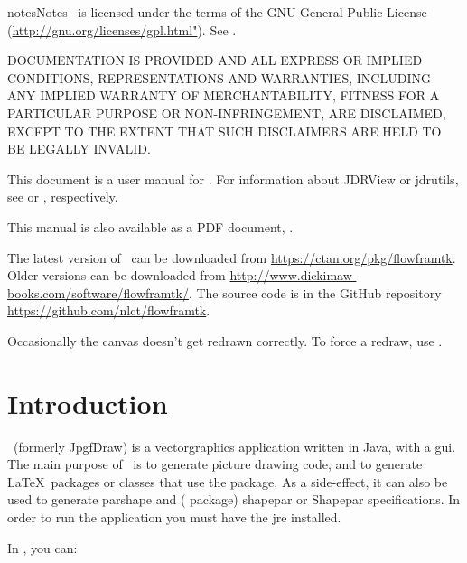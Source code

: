 \begin{prefrontmatterblock}{notes}{Notes}
\FlowframTk\ is licensed under the terms of the GNU General Public License
(\url{http://gnu.org/licenses/gpl.html"}).
See .

DOCUMENTATION IS PROVIDED  AND ALL EXPRESS OR IMPLIED
CONDITIONS, REPRESENTATIONS AND WARRANTIES, INCLUDING ANY
IMPLIED WARRANTY OF MERCHANTABILITY, FITNESS FOR A PARTICULAR
PURPOSE OR NON-INFRINGEMENT, ARE DISCLAIMED, EXCEPT TO THE EXTENT THAT
SUCH DISCLAIMERS ARE HELD TO BE LEGALLY INVALID.

This document is a user manual for \FlowframTk. For information about
JDRView or jdrutils, see  or
, respectively.

\IfTeXParserLib
  {%
    This manual is also available as a PDF document, . 
  }
  {}

The latest version of \FlowframTk\ can be downloaded from
\url{https://ctan.org/pkg/flowframtk}.
Older versions can be downloaded from
\url{http://www.dickimaw-books.com/software/flowframtk/}.
The source code is in the GitHub repository
\url{https://github.com/nlct/flowframtk}.

Occasionally the canvas doesn't get redrawn correctly. To force a
redraw, use .

\end{prefrontmatterblock}

\frontmatter
\tableofcontents
\listoffigures

\mainmatter
\chapter{Introduction}
\label{sec:introduction}

\FlowframTk\ (formerly \gls{JpgfDraw})
is a \gls{vectorgraphics} application written in \gls{Java}, with a 
\gls{gui}.  The main purpose of \FlowframTk\ is 
to generate  picture drawing code, and 
to generate \LaTeX\ packages or classes that use the  package. 
As a side-effect, it can also be
used to generate \gls{parshape} and ( package) \gls{shapepar} or 
\gls{Shapepar} specifications. In order to run the application you 
must have the \gls{jre} installed.

In \FlowframTk, you can:

